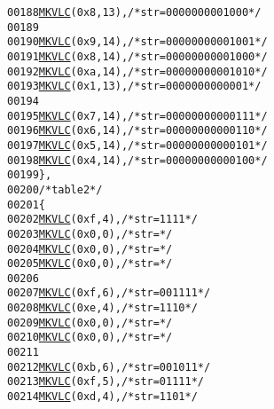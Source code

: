 \begin{footnotesize}
\begin{alltt}
00188         \hyperlink{vlc_8h_aa680b26539d09b5954221ff39a127faa}{MKVLC}( 0x8, 13 ), \textcolor{comment}{/* str=0000000001000 */}
00189 
00190         \hyperlink{vlc_8h_aa680b26539d09b5954221ff39a127faa}{MKVLC}( 0x9, 14 ), \textcolor{comment}{/* str=00000000001001 */}
00191         \hyperlink{vlc_8h_aa680b26539d09b5954221ff39a127faa}{MKVLC}( 0x8, 14 ), \textcolor{comment}{/* str=00000000001000 */}
00192         \hyperlink{vlc_8h_aa680b26539d09b5954221ff39a127faa}{MKVLC}( 0xa, 14 ), \textcolor{comment}{/* str=00000000001010 */}
00193         \hyperlink{vlc_8h_aa680b26539d09b5954221ff39a127faa}{MKVLC}( 0x1, 13 ), \textcolor{comment}{/* str=0000000000001 */}
00194 
00195         \hyperlink{vlc_8h_aa680b26539d09b5954221ff39a127faa}{MKVLC}( 0x7, 14 ), \textcolor{comment}{/* str=00000000000111 */}
00196         \hyperlink{vlc_8h_aa680b26539d09b5954221ff39a127faa}{MKVLC}( 0x6, 14 ), \textcolor{comment}{/* str=00000000000110 */}
00197         \hyperlink{vlc_8h_aa680b26539d09b5954221ff39a127faa}{MKVLC}( 0x5, 14 ), \textcolor{comment}{/* str=00000000000101 */}
00198         \hyperlink{vlc_8h_aa680b26539d09b5954221ff39a127faa}{MKVLC}( 0x4, 14 ), \textcolor{comment}{/* str=00000000000100 */}
00199     \},
00200     \textcolor{comment}{/* table 2 */}
00201     \{
00202         \hyperlink{vlc_8h_aa680b26539d09b5954221ff39a127faa}{MKVLC}( 0xf, 4 ), \textcolor{comment}{/* str=1111 */}
00203         \hyperlink{vlc_8h_aa680b26539d09b5954221ff39a127faa}{MKVLC}( 0x0, 0 ), \textcolor{comment}{/* str= */}
00204         \hyperlink{vlc_8h_aa680b26539d09b5954221ff39a127faa}{MKVLC}( 0x0, 0 ), \textcolor{comment}{/* str= */}
00205         \hyperlink{vlc_8h_aa680b26539d09b5954221ff39a127faa}{MKVLC}( 0x0, 0 ), \textcolor{comment}{/* str= */}
00206 
00207         \hyperlink{vlc_8h_aa680b26539d09b5954221ff39a127faa}{MKVLC}( 0xf, 6 ), \textcolor{comment}{/* str=001111 */}
00208         \hyperlink{vlc_8h_aa680b26539d09b5954221ff39a127faa}{MKVLC}( 0xe, 4 ), \textcolor{comment}{/* str=1110 */}
00209         \hyperlink{vlc_8h_aa680b26539d09b5954221ff39a127faa}{MKVLC}( 0x0, 0 ), \textcolor{comment}{/* str= */}
00210         \hyperlink{vlc_8h_aa680b26539d09b5954221ff39a127faa}{MKVLC}( 0x0, 0 ), \textcolor{comment}{/* str= */}
00211 
00212         \hyperlink{vlc_8h_aa680b26539d09b5954221ff39a127faa}{MKVLC}( 0xb, 6 ), \textcolor{comment}{/* str=001011 */}
00213         \hyperlink{vlc_8h_aa680b26539d09b5954221ff39a127faa}{MKVLC}( 0xf, 5 ), \textcolor{comment}{/* str=01111 */}
00214         \hyperlink{vlc_8h_aa680b26539d09b5954221ff39a127faa}{MKVLC}( 0xd, 4 ), \textcolor{comment}{/* str=1101 */}

\end{alltt}
\end{footnotesize}
